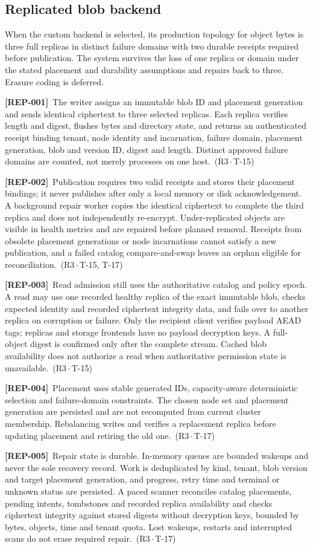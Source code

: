 \documentclass[11pt,a4paper]{article}
\newcommand{\reqtag}[2]{{\footnotesize\color{accent}(#1\,$\cdot$\,#2)}}
\newcommand{\req}[4]{\par\noindent\hypertarget{req:#1}{\textbf{[#1]}}\ #4\ \reqtag{#2}{#3}\par}
\begin{document}
\subsection{Replicated blob backend}\label{sec:replication}
When the custom backend is selected, its production topology for object bytes is three full replicas in distinct failure domains with two durable receipts required before publication. The system survives the loss of one replica or domain under the stated placement and durability assumptions and repairs back to three. Erasure coding is deferred.
\req{REP-001}{R3}{T-15}{The writer assigns an immutable blob ID and placement generation and sends identical ciphertext to three selected replicas. Each replica verifies length and digest, flushes bytes and directory state, and returns an authenticated receipt binding tenant, node identity and incarnation, failure domain, placement generation, blob and version ID, digest and length. Distinct approved failure domains are counted, not merely processes on one host.}
\req{REP-002}{R3}{T-15, T-17}{Publication requires two valid receipts and stores their placement bindings; it never publishes after only a local memory or disk acknowledgement. A background repair worker copies the identical ciphertext to complete the third replica and does not independently re-encrypt. Under-replicated objects are visible in health metrics and are repaired before planned removal. Receipts from obsolete placement generations or node incarnations cannot satisfy a new publication, and a failed catalog compare-and-swap leaves an orphan eligible for reconciliation.}
\req{REP-003}{R3}{T-15}{Read admission still uses the authoritative catalog and policy epoch. A read may use one recorded healthy replica of the exact immutable blob, checks expected identity and recorded ciphertext integrity data, and fails over to another replica on corruption or failure. Only the recipient client verifies payload AEAD tags; replicas and storage frontends have no payload decryption keys. A full-object digest is confirmed only after the complete stream. Cached blob availability does not authorize a read when authoritative permission state is unavailable.}
\req{REP-004}{R3}{T-17}{Placement uses stable generated IDs, capacity-aware deterministic selection and failure-domain constraints. The chosen node set and placement generation are persisted and are not recomputed from current cluster membership. Rebalancing writes and verifies a replacement replica before updating placement and retiring the old one.}
\req{REP-005}{R3}{T-17}{Repair state is durable. In-memory queues are bounded wakeups and never the sole recovery record. Work is deduplicated by kind, tenant, blob version and target placement generation, and progress, retry time and terminal or unknown status are persisted. A paced scanner reconciles catalog placements, pending intents, tombstones and recorded replica availability and checks ciphertext integrity against stored digests without decryption keys, bounded by bytes, objects, time and tenant quota. Lost wakeups, restarts and interrupted scans do not erase required repair.}
\end{document}
